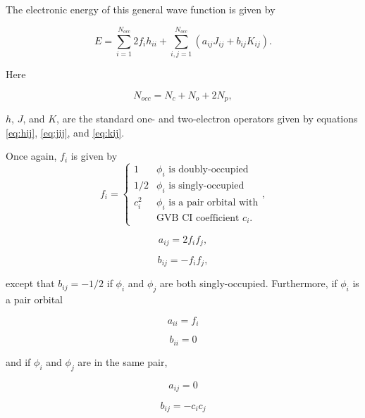 The electronic energy of this general wave function is given by 

\begin{equation}
  E = \sum_{i=1}^{N_{occ}} 2f_ih_{ii} + 
  \sum_{i,j=1}^{N_{occ}} (a_{ij}J_{ij} + b_{ij}K_{ij}).
\label{eq:egen2.7}
\end{equation}

\noindent Here

\begin{equation}
  N_{occ} = N_c + N_o + 2N_p,
\end{equation} 

\noindent $h$, $J$, and $K$, are the standard one- and two-electron
operators given by equations \ref{eq:hij}, \ref{eq:jij}, and
\ref{eq:kij}.

Once again, $f_i$ is given by \cite{Bobrowicz77} 
\begin{equation}
	f_i = \left\{\begin{array}{ll}
		1	& \mbox{$\phi_i$ is doubly-occupied} \\
		1/2	& \mbox{$\phi_i$ is singly-occupied} \\
		c_i^2 	& \mbox{$\phi_i$ is a pair orbital with} \\
			& \mbox{GVB CI coefficient $c_i$}.  
		\end{array}\right.,
\end{equation}

\begin{equation}
	a_{ij} = 2f_if_j,
\end{equation}

\begin{equation}
	b_{ij} = -f_if_j,
\end{equation}

\noindent except that $b_{ij} = -1/2$ if $\phi_i$ and $\phi_j$ are both
singly-occupied. Furthermore, if $\phi_i$ is a pair orbital

\begin{equation}
	a_{ii} = f_i
\end{equation}

\begin{equation}
	b_{ii} = 0
\end{equation}

\noindent and if $\phi_i$ and $\phi_j$ are in the same pair,

\begin{equation}
	a_{ij} = 0
\end{equation}

\begin{equation}
	b_{ij} = -c_ic_j
\end{equation}

